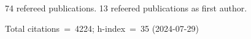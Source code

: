 74 refereed publications. 13 refeered publications as first author.

Total citations~=~4224; h-index~=~35 (2024-07-29)